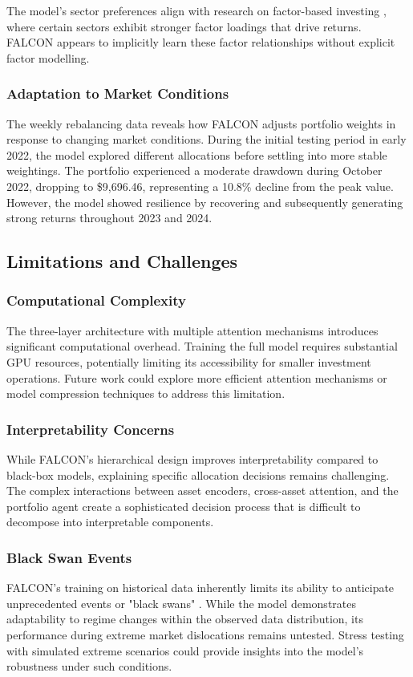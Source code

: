 \documentclass[conference]{IEEEtran}
\begin{document}
The model's sector preferences align with research on factor-based investing \cite{fama2015five}, where certain sectors exhibit stronger factor loadings that drive returns. FALCON appears to implicitly learn these factor relationships without explicit factor modelling.

\subsubsection{Adaptation to Market Conditions}
The weekly rebalancing data reveals how FALCON adjusts portfolio weights in response to changing market conditions. During the initial testing period in early 2022, the model explored different allocations before settling into more stable weightings. The portfolio experienced a moderate drawdown during October 2022, dropping to \$9,696.46, representing a 10.8\% decline from the peak value. However, the model showed resilience by recovering and subsequently generating strong returns throughout 2023 and 2024.

\subsection{Limitations and Challenges}

\subsubsection{Computational Complexity}
The three-layer architecture with multiple attention mechanisms introduces significant computational overhead. Training the full model requires substantial GPU resources, potentially limiting its accessibility for smaller investment operations. Future work could explore more efficient attention mechanisms or model compression techniques to address this limitation.

\subsubsection{Interpretability Concerns}
While FALCON's hierarchical design improves interpretability compared to black-box models, explaining specific allocation decisions remains challenging. The complex interactions between asset encoders, cross-asset attention, and the portfolio agent create a sophisticated decision process that is difficult to decompose into interpretable components.

\subsubsection{Black Swan Events}
FALCON's training on historical data inherently limits its ability to anticipate unprecedented events or "black swans" \cite{taleb2007black}. While the model demonstrates adaptability to regime changes within the observed data distribution, its performance during extreme market dislocations remains untested. Stress testing with simulated extreme scenarios could provide insights into the model's robustness under such conditions.
\end{document}
